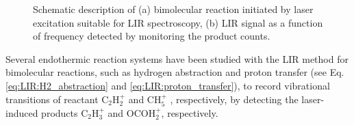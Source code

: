\begin{figure}[!htb]
    \centering
    \hfill
    \hfill
    \caption{Schematic description of (a) bimolecular reaction initiated by laser excitation suitable for LIR spectroscopy, (b) LIR signal as a function of frequency detected by monitoring the product counts.}
    \label{fig:action:methods:vibrational:LIR-full}
\end{figure}

Several endothermic reaction systems have been studied with the LIR method for bimolecular reactions, such as hydrogen abstraction and proton transfer (see Eq. \ref{eq:LIR:H2_abstraction} and  \ref{eq:LIR:proton_transfer}), to record vibrational transitions of reactant C$_2$H$_2^+$ \cite{schlemmer_laser_2002, asvany_experimental_2005, schlemmer_comparison_2005} and CH$_5^+$ \cite{asvany_understanding_2005}, respectively, by detecting the laser-induced products C$_2$H$_3^+$ and OCOH$_2^+$, respectively.

